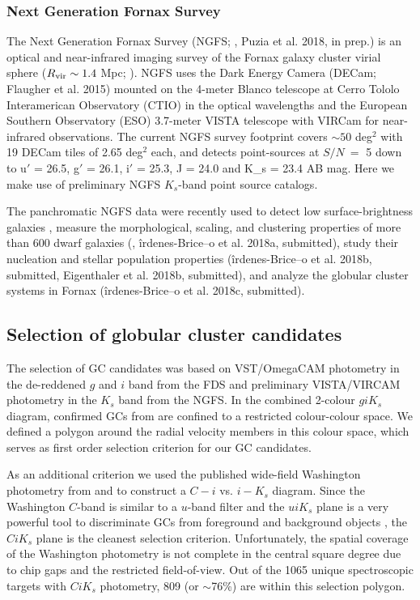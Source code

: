 \documentclass[useAMS,usenatbib]{mn2e}
\begin{document}
\subsubsection{Next Generation Fornax Survey}
\label{sec:NGFS}
The Next Generation Fornax Survey (NGFS; \citealt{munoz+05}, Puzia et al. 2018, in prep.) 
is an optical and near-infrared imaging survey of the Fornax
galaxy cluster virial sphere ($R_{\rm vir}\sim 1.4$ Mpc; \citealt{Drinkwater+01}). 
NGFS uses the Dark Energy Camera (DECam; Flaugher et al. 2015) mounted on the 
4-meter Blanco telescope at Cerro Tololo Interamerican Observatory (CTIO) in the 
optical wavelengths and the European Southern Observatory (ESO) 3.7-meter VISTA 
telescope with VIRCam \citep{sutherland+15} for near-infrared observations. 
The current NGFS survey footprint covers $\sim50$ deg$^2$ with 19 DECam tiles of 2.65 
deg$^2$ each, and detects point-sources at $S/N\ =$ 5 down to u$'$ = 26.5, g$'$ = 26.1, 
i$'$ = 25.3, J = 24.0 and K_s = 23.4 AB mag. Here we make use of preliminary NGFS 
$K_s$-band point source catalogs.

The panchromatic NGFS data were recently used to detect low surface-brightness 
galaxies \citep{munoz+15}, measure the morphological, scaling, and clustering 
properties of more than 600 dwarf galaxies (\citealt{Eigenthaler18}, îrdenes-Brice–o 
et al. 2018a, submitted), study their nucleation and stellar population properties 
(îrdenes-Brice–o et al. 2018b, submitted, Eigenthaler et al. 2018b, submitted), 
and analyze the globular cluster systems in Fornax (îrdenes-Brice–o et al. 2018c, submitted). 

\subsection{Selection of globular cluster candidates}
\label{sec:selectionGC}
The selection of GC candidates was based on VST/OmegaCAM photometry in the de-reddened $g$ 
and $i$ band from the FDS \citep{DAbrusco16,Iodice16} and preliminary 
VISTA/VIRCAM photometry in the $K_s$ band from the NGFS. 
In the combined 2-colour $g i K_s$ diagram, confirmed GCs from \citet{Schuberth}
are confined to a restricted colour-colour space. We defined a polygon around 
the radial velocity members in this colour space, which serves as first order 
selection criterion for our GC candidates. 

As an additional criterion we used the published wide-field Washington 
photometry from \citet{Dirsch04} and \citet{Bassino} to construct a $C-i$ vs. 
$i-K_s$ diagram. Since the Washington $C$-band is similar to a $u$-band filter 
and the $uiK_s$ plane is a very powerful tool to discriminate GCs from 
foreground and background objects \citep{Munoz14}, the $CiK_s$ plane is the 
cleanest selection criterion. Unfortunately, the spatial coverage of the 
Washington photometry is not complete in the central square degree due to chip 
gaps and the restricted field-of-view. Out of the 1065 unique spectroscopic 
targets with $CiK_s$ photometry, 809 (or $\sim$76\%) are within this selection 
polygon.
\end{document}
